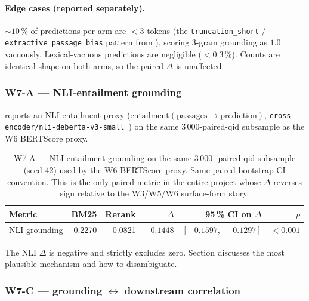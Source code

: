 \documentclass[11pt,a4paper]{article}
\newcommand{\bertscore}{BERTScore}
\newcommand{\bmtwofive}{BM25}
\newcommand{\code}[1]{\texttt{#1}}
\begin{document}
\paragraph{Edge cases (reported separately).}  $\sim\!10\,\%$ of
predictions per arm are $<\!3$ tokens (the \texttt{truncation\_short}
/ \texttt{extractive\_passage\_bias} pattern from
), scoring 3-gram grounding as $1.0$
vacuously.  Lexical-vacuous predictions are negligible
($<\!0.3\,\%$).  Counts are identical-shape on both arms, so the
paired $\Delta$ is unaffected.

\subsubsection{W7-A --- NLI-entailment grounding}
\label{sec:w7-nli}

 reports an NLI-entailment proxy
($\text{entailment}(\text{passages} \to \text{prediction})$,
\code{cross-\allowbreak encoder/\allowbreak nli-\allowbreak deberta-v3-small}~\cite{he2023debertav3,williams2018mnli})
on the same 3\,000-paired-qid subsample as the W6 \bertscore{}
proxy.

\begin{table}[H]
  \centering
  \caption{W7-A --- NLI-entailment grounding on the same 3\,000-
  paired-qid subsample (seed 42) used by the W6 \bertscore{} proxy.
  Same paired-bootstrap CI convention.  This is the only paired
  metric in the entire project whose $\Delta$ reverses sign relative
  to the W3/W5/W6 surface-form story.}
  \label{tab:w7-nli}
  \begin{tabular}{lrrrrr}
    \toprule
    Metric    & \bmtwofive{} & Rerank & $\Delta$ & 95\,\% CI on $\Delta$ & $p$ \\
    \midrule
    NLI grounding & 0.2270   & 0.0821 & $\mathbf{-0.1448}$ & $[-0.1597,\,-0.1297]$ & $<\!0.001$ \\
    \bottomrule
  \end{tabular}
\end{table}

The NLI $\Delta$ is negative and strictly excludes zero.  Section
 discusses the most plausible
mechanism and how to disambiguate.

\subsubsection{W7-C --- grounding $\leftrightarrow$ downstream
correlation}
\end{document}
